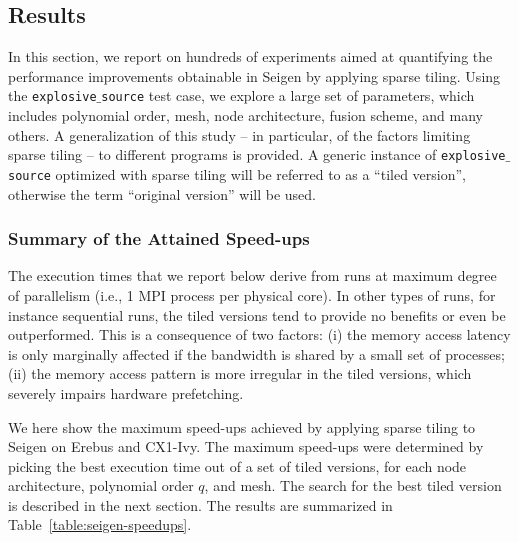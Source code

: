 \subsection{Results}
\label{sec:tiling:seigen-results}
In this section, we report on hundreds of experiments aimed at quantifying the performance improvements obtainable in Seigen by applying sparse tiling. Using the {\tt explosive$\_$source} test case, we explore a large set of parameters, which includes polynomial order, mesh, node architecture, fusion scheme, and many others. A generalization of this study -- in particular, of the factors limiting sparse tiling -- to different programs is provided. A generic instance of {\tt explosive$\_$source} optimized with sparse tiling will be referred to as a ``tiled version'', otherwise the term ``original version'' will be used.

\subsubsection{Summary of the Attained Speed-ups}
The execution times that we report below derive from runs at maximum degree of parallelism (i.e., 1 MPI process per physical core). In other types of runs, for instance sequential runs, the tiled versions tend to provide no benefits or even be outperformed. This is a consequence of two factors: (i) the memory access latency is only marginally affected if the bandwidth is shared by a small set of processes; (ii) the memory access pattern is more irregular in the tiled versions, which severely impairs hardware prefetching. 

We here show the maximum speed-ups achieved by applying sparse tiling to Seigen on Erebus and CX1-Ivy. The maximum speed-ups were determined by picking the best execution time out of a set of tiled versions, for each node architecture, polynomial order $q$, and mesh. The search for the best tiled version is described in the next section. The results are summarized in Table~\ref{table:seigen-speedups}.

